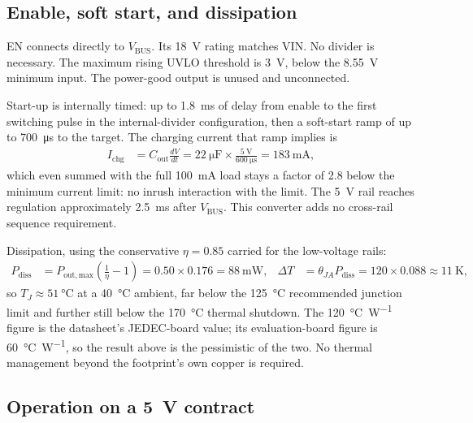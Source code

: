 \subsection{Enable, soft start, and dissipation}\label{sec:5v-ss}

EN connects directly to $V_{\mathrm{BUS}}$. Its \SI{18}{\volt} rating matches
VIN. No divider is necessary. The maximum rising UVLO threshold is
\SI{3}{\volt}, below the \SI{8.55}{\volt} minimum input. The power-good output is
unused and unconnected.

Start-up is internally timed: up to \SI{1.8}{\milli\second} of delay from enable
to the first switching pulse in the internal-divider configuration, then a
soft-start ramp of up to \SI{700}{\micro\second} to the target. The charging
current that ramp implies is
\begin{align*}
  I_{\mathrm{chg}} &= C_{\mathrm{out}}\frac{dV}{dt}
    = \SI{22}{\micro\farad}\times\frac{\SI{5}{\volt}}{\SI{600}{\micro\second}}
    = \SI{183}{\milli\ampere},
\end{align*}
which even summed with the full \SI{100}{\milli\ampere} load stays a factor of
\num{2.8} below the minimum current limit: no inrush interaction with the limit.
The 5~V rail reaches regulation approximately \SI{2.5}{\milli\second} after
$V_{\mathrm{BUS}}$. This converter adds no cross-rail sequence requirement.

Dissipation, using the conservative $\eta = 0.85$ carried for the low-voltage
rails:
\begin{align*}
  P_{\mathrm{diss}} &= P_{\mathrm{out,max}}\left(\frac{1}{\eta}-1\right)
    = 0.50 \times 0.176 = \SI{88}{\milli\watt}, &
  \Delta T &= \theta_{JA} P_{\mathrm{diss}} = 120 \times 0.088 \approx \SI{11}{\kelvin},
\end{align*}
so $T_J \approx \SI{51}{\celsius}$ at a \SI{40}{\celsius} ambient, far below the
\SI{125}{\celsius} recommended junction limit and further still below the
\SI{170}{\celsius} thermal shutdown. The \SI{120}{\celsius\per\watt} figure is
the datasheet's JEDEC-board value; its evaluation-board figure is
\SI{60}{\celsius\per\watt}, so the result above is the pessimistic of the two.
No thermal management beyond the footprint's own copper is required.

\subsection{Operation on a \SI{5}{\volt} contract}\label{sec:5v-limited}

